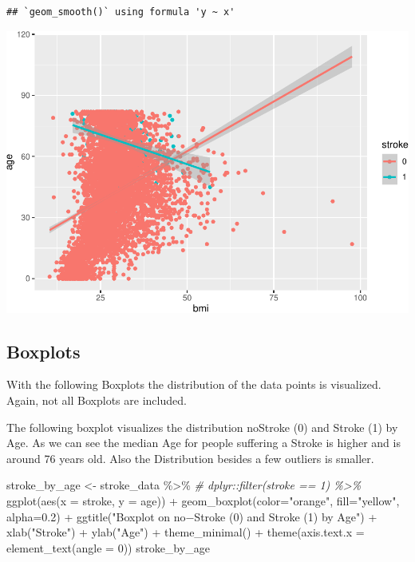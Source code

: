 \documentclass[
]{article}
\newenvironment{Shaded}{\begin{snugshade}}{\end{snugshade}}
\newcommand{\AttributeTok}[1]{\textcolor[rgb]{0.77,0.63,0.00}{#1}}
\newcommand{\CommentTok}[1]{\textcolor[rgb]{0.56,0.35,0.01}{\textit{#1}}}
\newcommand{\DecValTok}[1]{\textcolor[rgb]{0.00,0.00,0.81}{#1}}
\newcommand{\FloatTok}[1]{\textcolor[rgb]{0.00,0.00,0.81}{#1}}
\newcommand{\FunctionTok}[1]{\textcolor[rgb]{0.00,0.00,0.00}{#1}}
\newcommand{\NormalTok}[1]{#1}
\newcommand{\OtherTok}[1]{\textcolor[rgb]{0.56,0.35,0.01}{#1}}
\newcommand{\SpecialCharTok}[1]{\textcolor[rgb]{0.00,0.00,0.00}{#1}}
\newcommand{\StringTok}[1]{\textcolor[rgb]{0.31,0.60,0.02}{#1}}
\renewcommand{\=}[1]{\stackrel{#1}{=}}
\theoremstyle{definition}
\theoremstyle{remark}
\begin{document}
\begin{verbatim}
## `geom_smooth()` using formula 'y ~ x'
\end{verbatim}

\includegraphics{sioux_mach_learn_project_files/figure-latex/unnamed-chunk-15-1.pdf}

\hypertarget{boxplots}{%
\subsection{Boxplots}\label{boxplots}}

With the following Boxplots the distribution of the data points is visualized. Again, not all Boxplots are included.

The following boxplot visualizes the distribution noStroke (0) and Stroke (1) by Age. As we can see the median Age for people suffering a Stroke is higher and is around 76 years old. Also the Distribution besides a few outliers is smaller.

\begin{Shaded}
\begin{Highlighting}[]
\NormalTok{stroke\_by\_age }\OtherTok{\textless{}{-}}\NormalTok{ stroke\_data }\SpecialCharTok{\%\textgreater{}\%}
\CommentTok{\# dplyr::filter(stroke == 1) \%\textgreater{}\%}
 \FunctionTok{ggplot}\NormalTok{(}\FunctionTok{aes}\NormalTok{(}\AttributeTok{x =}\NormalTok{ stroke,}
            \AttributeTok{y =}\NormalTok{ age)) }\SpecialCharTok{+}
  \FunctionTok{geom\_boxplot}\NormalTok{(}\AttributeTok{color=}\StringTok{"orange"}\NormalTok{, }\AttributeTok{fill=}\StringTok{"yellow"}\NormalTok{, }\AttributeTok{alpha=}\FloatTok{0.2}\NormalTok{) }\SpecialCharTok{+}
  \FunctionTok{ggtitle}\NormalTok{(}\StringTok{"Boxplot on no−Stroke (0) and Stroke (1) by Age"}\NormalTok{) }\SpecialCharTok{+} 
  \FunctionTok{xlab}\NormalTok{(}\StringTok{"Stroke"}\NormalTok{) }\SpecialCharTok{+} \FunctionTok{ylab}\NormalTok{(}\StringTok{"Age"}\NormalTok{) }\SpecialCharTok{+}
  \FunctionTok{theme\_minimal}\NormalTok{() }\SpecialCharTok{+} \FunctionTok{theme}\NormalTok{(}\AttributeTok{axis.text.x =} \FunctionTok{element\_text}\NormalTok{(}\AttributeTok{angle =} \DecValTok{0}\NormalTok{)) }
\NormalTok{stroke\_by\_age }
\end{Highlighting}
\end{Shaded}
\end{document}
